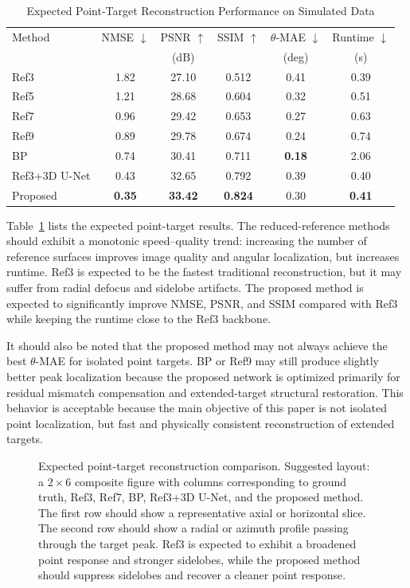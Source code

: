 \documentclass[journal]{IEEEtran}
\begin{document}
\begin{table}[t]
\caption{Expected Point-Target Reconstruction Performance on Simulated Data}
\label{tab:point_target_results}
\centering
\begin{tabular}{lccccc}
\hline
Method & NMSE $\downarrow$ & PSNR $\uparrow$ & SSIM $\uparrow$ & $\theta$-MAE $\downarrow$ & Runtime $\downarrow$ \\
 &  & (dB) &  & (deg) & (s) \\
\hline
Ref3 & 1.82 & 27.10 & 0.512 & 0.41 & 0.39 \\
Ref5 & 1.21 & 28.68 & 0.604 & 0.32 & 0.51 \\
Ref7 & 0.96 & 29.42 & 0.653 & 0.27 & 0.63 \\
Ref9 & 0.89 & 29.78 & 0.674 & 0.24 & 0.74 \\
BP & 0.74 & 30.41 & 0.711 & \textbf{0.18} & 2.06 \\
Ref3+3D U-Net & 0.43 & 32.65 & 0.792 & 0.39 & 0.40 \\
Proposed & \textbf{0.35} & \textbf{33.42} & \textbf{0.824} & 0.30 & \textbf{0.41} \\
\hline
\end{tabular}
\end{table}

Table~\ref{tab:point_target_results} lists the expected point-target results. The reduced-reference methods should exhibit a monotonic speed--quality trend: increasing the number of reference surfaces improves image quality and angular localization, but increases runtime. Ref3 is expected to be the fastest traditional reconstruction, but it may suffer from radial defocus and sidelobe artifacts. The proposed method is expected to significantly improve NMSE, PSNR, and SSIM compared with Ref3 while keeping the runtime close to the Ref3 backbone.

It should also be noted that the proposed method may not always achieve the best $\theta$-MAE for isolated point targets. BP or Ref9 may still produce slightly better peak localization because the proposed network is optimized primarily for residual mismatch compensation and extended-target structural restoration. This behavior is acceptable because the main objective of this paper is not isolated point localization, but fast and physically consistent reconstruction of extended targets.

\begin{figure}[t]
\centering
{}
\caption{Expected point-target reconstruction comparison. Suggested layout: a $2\times6$ composite figure with columns corresponding to ground truth, Ref3, Ref7, BP, Ref3+3D U-Net, and the proposed method. The first row should show a representative axial or horizontal slice. The second row should show a radial or azimuth profile passing through the target peak. Ref3 is expected to exhibit a broadened point response and stronger sidelobes, while the proposed method should suppress sidelobes and recover a cleaner point response.}
\label{fig:point_target_visual}
\end{figure}
\end{document}
